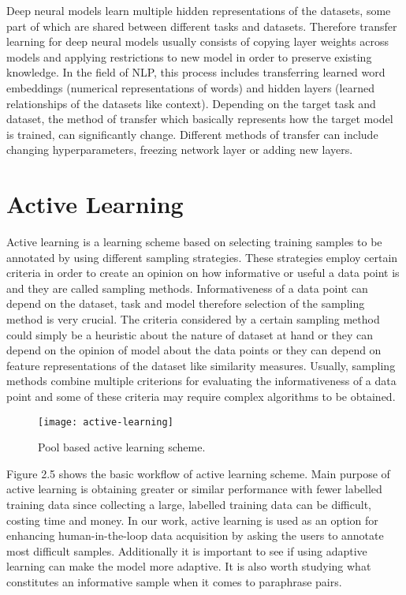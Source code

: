 Deep neural models learn multiple hidden representations of the datasets, some part of which are shared between different tasks and datasets. Therefore transfer learning for deep neural models usually consists of copying layer weights across models and applying restrictions to new model in order to preserve existing knowledge. In the field of NLP, this process includes transferring learned word embeddings (numerical representations of words) and hidden layers (learned relationships of the datasets like context). Depending on the target task and dataset, the method of transfer which basically represents how the target model is trained, can significantly change. Different methods of transfer can include changing hyperparameters, freezing network layer or adding new layers.

\section{Active Learning}

Active learning is a learning scheme based on selecting training samples to be annotated by using different sampling strategies. These strategies employ certain criteria in order to create an opinion on how informative or useful a data point is and they are called sampling methods. Informativeness of a data point can depend on the dataset, task and model therefore selection of the sampling method is very crucial. The criteria considered by a certain sampling method could simply be a heuristic about the nature of dataset at hand or they can depend on the opinion of model about the data points or they can depend on feature representations of the dataset like similarity measures. Usually, sampling methods combine multiple criterions for evaluating the informativeness of a data point and some of these criteria may require complex algorithms to be obtained. 

\begin{figure}[t]
\texttt{[image: active-learning]}
\centering
\caption{Pool based active learning scheme.}
\end{figure}

Figure 2.5 shows the basic workflow of active learning scheme. Main purpose of active learning is obtaining greater or similar performance with fewer labelled training data since collecting a large, labelled training data can be difficult, costing time and money. In our work, active learning is used as an option for enhancing human-in-the-loop data acquisition by asking the users to annotate most difficult samples. Additionally it is important to see if using adaptive learning can make the model more adaptive. It is also worth studying what constitutes an informative sample when it comes to paraphrase pairs.